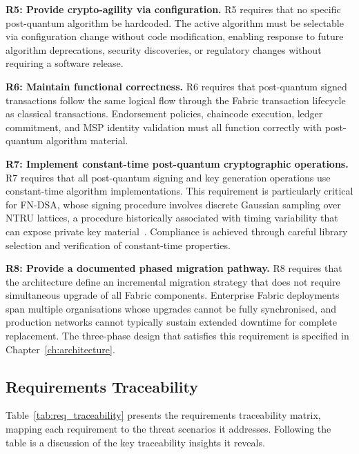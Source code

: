 \documentclass[conference]{IEEEtran}
\begin{document}
\textbf{R5: Provide crypto-agility via configuration.}
R5 requires that no specific post-quantum algorithm be hardcoded. The
active algorithm must be selectable via configuration change without code
modification, enabling response to future algorithm deprecations, security
discoveries, or regulatory changes without requiring a software release.

\textbf{R6: Maintain functional correctness.}
R6 requires that post-quantum signed transactions follow the same logical
flow through the Fabric transaction lifecycle as classical transactions.
Endorsement policies, chaincode execution, ledger commitment, and MSP
identity validation must all function correctly with post-quantum
algorithm material.

\textbf{R7: Implement constant-time post-quantum cryptographic operations.}
R7 requires that all post-quantum signing and key generation operations
use constant-time algorithm implementations. This requirement is
particularly critical for FN-DSA, whose signing procedure involves
discrete Gaussian sampling over NTRU lattices, a procedure historically
associated with timing variability that can expose private key
material~\cite{pessl2019}. Compliance is achieved through careful library
selection and verification of constant-time properties.

\textbf{R8: Provide a documented phased migration pathway.}
R8 requires that the architecture define an incremental migration strategy
that does not require simultaneous upgrade of all Fabric components.
Enterprise Fabric deployments span multiple organisations whose upgrades
cannot be fully synchronised, and production networks cannot typically
sustain extended downtime for complete replacement. The three-phase design
that satisfies this requirement is specified in Chapter~\ref{ch:architecture}.

\subsection{Requirements Traceability}

Table~\ref{tab:req_traceability} presents the requirements traceability
matrix, mapping each requirement to the threat scenarios it addresses.
Following the table is a discussion of the key traceability insights
it reveals.
\end{document}
